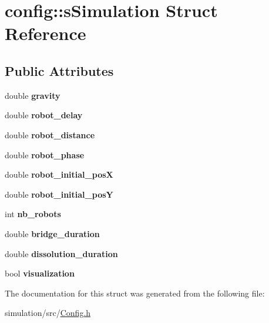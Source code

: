 \hypertarget{structconfig_1_1s_simulation}{}\section{config\+:\+:s\+Simulation Struct Reference}
\label{structconfig_1_1s_simulation}
\subsection*{Public Attributes}
\begin{DoxyCompactItemize}
\item 
\mbox{\label{structconfig_1_1s_simulation_a25ccff214dabfb1a6f711f8350ae8871}} 
double {\bfseries gravity}
\item 
\mbox{\label{structconfig_1_1s_simulation_a967cb0f1917b6a79271401bf64978533}} 
double {\bfseries robot\+\_\+delay}
\item 
\mbox{\label{structconfig_1_1s_simulation_a9a76eabe85007447b4ffc3cf80499661}} 
double {\bfseries robot\+\_\+distance}
\item 
\mbox{\label{structconfig_1_1s_simulation_a162430ba1e14142b5e17c46607473a5d}} 
double {\bfseries robot\+\_\+phase}
\item 
\mbox{\label{structconfig_1_1s_simulation_a79abcea43cc4f6b0288b89ef25cc0001}} 
double {\bfseries robot\+\_\+initial\+\_\+posX}
\item 
\mbox{\label{structconfig_1_1s_simulation_a5f210266729c02d90c6434407c520a46}} 
double {\bfseries robot\+\_\+initial\+\_\+posY}
\item 
\mbox{\label{structconfig_1_1s_simulation_a2c1ada081a51c0fe22a0a792e86b2a7d}} 
int {\bfseries nb\+\_\+robots}
\item 
\mbox{\label{structconfig_1_1s_simulation_aff5f4baa8b4f27a11ddb1ca2dae35aee}} 
double {\bfseries bridge\+\_\+duration}
\item 
\mbox{\label{structconfig_1_1s_simulation_ad8704f9eb529596937a9ab05f776f8ea}} 
double {\bfseries dissolution\+\_\+duration}
\item 
\mbox{\label{structconfig_1_1s_simulation_a4e43c8d5ae20bd2e8bd9b3465a974de7}} 
bool {\bfseries visualization}
\end{DoxyCompactItemize}


The documentation for this struct was generated from the following file\+:\begin{DoxyCompactItemize}
\item 
simulation/src/\mbox{\hyperlink{_config_8h}{Config.\+h}}\end{DoxyCompactItemize}
